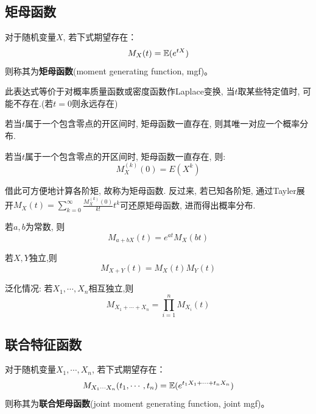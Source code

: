 \subsection{矩母函数}

\begin{definition}
    对于随机变量$X$, 若下式期望存在：
    \[ M_X(t) = \mathbb{E}(e^{tX}) \]
    则称其为\textbf{矩母函数}(moment generating function, mgf)。
\end{definition}
\begin{remark}
    此表达式等价于对概率质量函数或密度函数作Laplace变换, 当$t$取某些特定值时, 可能不存在.(若$t=0$则永远存在)
\end{remark}

\begin{theorem}
    若当$t$属于一个包含零点的开区间时, 矩母函数一直存在, 则其唯一对应一个概率分布.
\end{theorem}

\begin{theorem}
    若当$t$属于一个包含零点的开区间时, 矩母函数一直存在, 则:
    \[ M_X^{(k)}(0) = E(X^k) \]
\end{theorem}
\begin{remark}
    借此可方便地计算各阶矩, 故称为矩母函数. 反过来, 若已知各阶矩, 通过Tayler展开$M_X(t)=\sum_{k=0}^{\infty}\frac{M_X^{(k)}(0)}{k!}t^k$可还原矩母函数, 进而得出概率分布.
\end{remark}

\begin{proposition}
    若$a,b$为常数, 则
    \[ M_{a+b X}(t) = e^{a t}M_X(b t) \]
\end{proposition}

\begin{theorem}\label{thm:mgf_sum}
    若$X,Y$独立,则
    \[ M_{X+Y}(t) = M_X(t) M_Y(t) \]

    泛化情况: 若$X_1,\cdots, X_n$相互独立,则
    \[ M_{X_1+\cdots+ X_n} = \prod_{i=1}^n M_{X_i}(t)\]
\end{theorem}

\subsection{联合特征函数}

\begin{definition}
    对于随机变量$X_1,\cdots, X_n$, 若下式期望存在：
    \[ M_{X_1\cdots X_n}(t_1,\cdots ,t_n) = \mathbb{E}(e^{t_1 X_1+\cdots + t_n X_n}) \]
    则称其为\textbf{联合矩母函数}(joint moment generating function, joint mgf)。
\end{definition}

